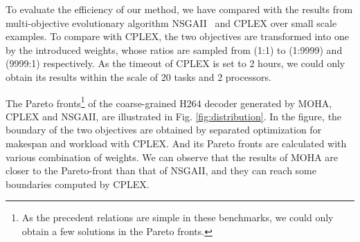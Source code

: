 %
%  

To evaluate the efficiency of our method, we have compared with the results from multi-objective evolutionary algorithm NSGAII~\cite{deb2002fast} and CPLEX over small scale examples. To compare with CPLEX, the two objectives are transformed into one by the introduced weights, whose ratios are sampled from (1:1) to (1:9999) and (9999:1) respectively. As the timeout of CPLEX is set to 2 hours, we could only obtain its results within the scale of 20 tasks and 2 processors.

 
The Pareto fronts\footnote{As the precedent relations are simple in these benchmarks, we could only obtain a few solutions in the Pareto fronts. } of the coarse-grained H264 decoder generated by MOHA, CPLEX and NSGAII, are illustrated in Fig. \ref{fig:distribution}. 
In the figure, the boundary of the two objectives are obtained by separated optimization for makespan and workload with CPLEX. 
And its Pareto fronts are calculated with various combination of weights.
We can observe that the results of MOHA are closer to the Pareto-front than that of NSGAII, and they can reach some boundaries computed by CPLEX. %


